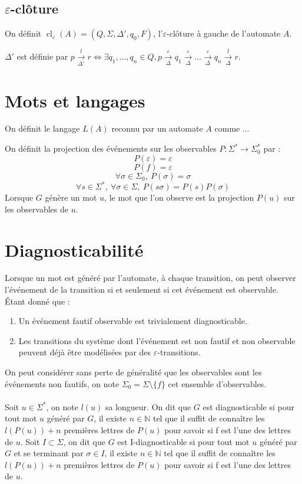 \documentclass[10pt,a4paper]{article}
\begin{document}
\subsection{$\varepsilon$-clôture}

On définit  $\operatorname{cl}_\varepsilon(A) = (Q, \Sigma, \Delta', q_0, F)$, l'$\varepsilon$-clôture \`a gauche de l'automate $A$.

$\Delta'$ est d\'efinie par $p \overset{l}{\underset{\Delta'}{\to}} r \iff \exists q_1,\dots,q_n \in Q, p \overset{\varepsilon}{\underset{\Delta}{\to}} q_1 \overset{\varepsilon}{\underset{\Delta}{\to}} \dots \overset{\varepsilon}{\underset{\Delta}{\to}} q_n \overset{l}{\underset{\Delta}{\to}} r$.

\section{Mots et langages}

On d\'efinit le langage $L(A)$ reconnu par un automate $A$ comme ...

On définit la projection des événements sur les observables $P:\Sigma^* \rightarrow \Sigma_0^*$ par :
$$P(\varepsilon) = \varepsilon$$
$$P(f) = \varepsilon$$
$$\forall \sigma \in \Sigma_0,\ P(\sigma) = \sigma$$
$$\forall s \in \Sigma^*, \ \forall \sigma \in \Sigma,\ P(s\sigma) = P(s)P(\sigma)$$
Lorsque $G$ génère un mot $u$, le mot que l'on observe est la projection $P(u)$ sur les observables de $u$.

\section{Diagnosticabilit\'e}

Lorsque un mot est généré par l'automate, à chaque transition, on peut observer l’événement de la transition si et seulement si cet événement est observable. Étant donné que :
\begin{enumerate}
\item Un événement fautif observable est trivialement diagnosticable.
\item Les transitions du système dont l'événement est non fautif et non observable peuvent déjà être modélisées par des $\varepsilon$-transitions.
\end{enumerate} 
On peut considérer sans perte de généralité que les observables sont les événements non fautifs, on note $\Sigma_0 = \Sigma \setminus \{f\}$ cet ensemble d'observables.
\paragraph{}
Soit $u \in \Sigma^*$, on note $l(u)$ sa longueur. On dit que $G$ est diagnosticable si pour tout mot $u$ généré par $G$, il existe $n \in \mathbb{N}$ tel que il suffit de connaître les $l(P(u)) + n$ premières lettres de $P(u)$ pour savoir si f est l'une des lettres de $u$. Soit $I \subset \Sigma$, on dit que $G$ est I-diagnosticable si pour tout mot $u$ généré par $G$ et se terminant par $\sigma \in I$, il existe $n \in \mathbb{N}$ tel que il suffit de connaître les $l(P(u)) + n$ premières lettres de $P(u)$ pour savoir si f est l'une des lettres de $u$.
\end{document}
